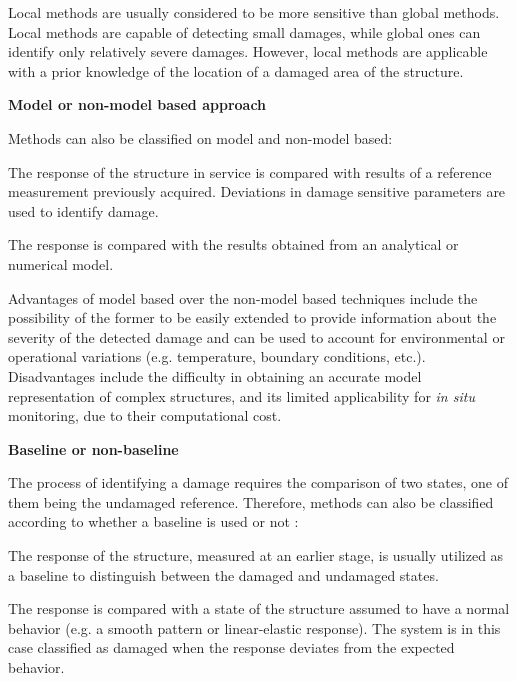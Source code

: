 Local methods are usually considered to be more sensitive than global methods. Local methods are capable of detecting small damages, while global ones can identify only relatively severe damages. However, local methods are applicable with a prior knowledge of the location of a damaged area of the structure.

\textbf{Model or non-model based approach}

Methods can also be classified on model and non-model based:

\begin{description}[style=sameline]
\item[Non-model based] The response of the structure in service is compared with results of a reference measurement previously acquired. Deviations in damage sensitive parameters are used to identify damage.
\item[Model based] The response is compared with the results obtained from an analytical or numerical model.
\end{description}

Advantages of model based over the non-model based techniques include the possibility of the former to be easily extended to provide information about the severity of the detected damage and can be used to account for environmental or operational variations (e.g. temperature, boundary conditions, etc.). Disadvantages include the difficulty in obtaining an accurate model representation of complex structures, and its limited applicability for \textit{in situ} monitoring, due to their computational cost.

\textbf{Baseline or non-baseline}

The process of identifying a damage requires the comparison of two states, one of them being the undamaged reference. Therefore, methods can also be classified according to whether  a baseline is used or not \cite{Worden2007}:

\begin{description}[style=sameline]
\item[Baseline] The response of the structure, measured at an earlier stage, is usually utilized as a baseline to distinguish between the damaged and undamaged states.
\item[Non-baseline] The response is compared with a state of the structure assumed to have a normal behavior (e.g. a smooth pattern or linear-elastic response). The system is in this case classified as damaged when the response deviates from the expected behavior.
\end{description}

